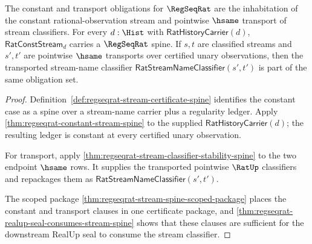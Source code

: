 \begin{theorem}
\label{thm:regseqrat-constant-and-transport-obligation}
The constant and transport obligations for $\RegSeqRat$ are the inhabitation of
the constant rational-observation stream and pointwise $\hsame$ transport of
stream classifiers. For every $d:\Hist$ with
$\mathsf{RatHistoryCarrier}(d)$, $\mathsf{RatConstStream}_d$ carries a
$\RegSeqRat$ spine. If $s,t$ are classified streams and $s',t'$ are pointwise
$\hsame$ transports over certified unary observations, then the transported
stream-name classifier $\mathsf{RatStreamNameClassifier}(s',t')$ is part of
the same obligation set.
\end{theorem}
\begin{proof}
Definition~\ref{def:regseqrat-stream-certificate-spine} identifies the
constant case as a spine over a stream-name carrier plus a regularity ledger.
Apply \autoref{thm:regseqrat-constant-stream-spine} to the supplied
$\mathsf{RatHistoryCarrier}(d)$; the resulting ledger is constant at every
certified unary observation.

For transport, apply
\autoref{thm:regseqrat-stream-classifier-stability-spine} to the two endpoint
$\hsame$ rows. It supplies the transported pointwise $\RatUp$ classifiers and
repackages them as $\mathsf{RatStreamNameClassifier}(s',t')$.

The scoped package
\autoref{thm:regseqrat-stream-spine-scoped-package} places the constant and
transport clauses in one certificate package, and
\autoref{thm:regseqrat-realup-seal-consumes-stream-spine} shows that these
clauses are sufficient for the downstream RealUp seal to consume the stream
classifier.
\end{proof}

